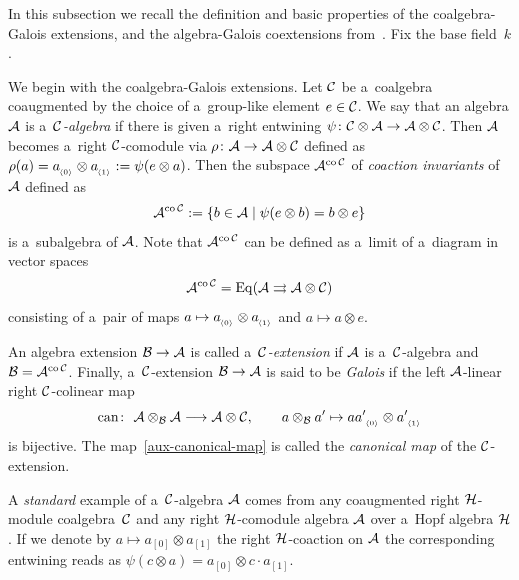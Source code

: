 \documentclass[pdftex]{sigma}
\numberwithin{equation}{section}
\DeclareMathOperator{\co}{co}
\newcommand{\ns}[1]{~\hspace{-4pt}_{_{{\langle#1\rangle}}}}
\begin{document}
In this subsection we recall the def\/inition and basic properties of the coalgebra-Galois extensions, and the
algebra-Galois coextensions from~\cite{BrzeHaja99,BrzeHaja09}.
Fix the base f\/ield~$k$.

We begin with the coalgebra-Galois extensions.
Let ${\cal C}$ be a~coalgebra coaugmented by the choice of a~group-like element $e\in {\cal C}$.
We say that an algebra ${\cal A}$ is a~\emph{${\cal C}$-algebra} if there is given a~right entwining $\psi\colon  {\cal
C}\otimes {\cal A}\rightarrow {\cal A}\otimes {\cal C}$.
Then ${\cal A}$ becomes a~right ${\cal C}$-comodule via $\rho\colon {\cal A} \to {\cal A} \otimes {\cal C}$ def\/ined as
$\rho(a) =a\ns{0} \otimes a\ns{1}:=\psi(e\otimes a)$.
Then the subspace ${\cal A}^{\co {\cal C}}$ of \emph{coaction invariants} of ${\cal A}$ def\/ined as
\begin{gather*}
{\cal A}^{\co {\cal C}}:=\{b \in {\cal A} \mid \psi(e\otimes b)=b\otimes e\}
\end{gather*}
is a~subalgebra of ${\cal A}$.
Note that ${\cal A}^{\co {\cal C}}$ can be def\/ined as a~limit of a~diagram in vector spaces
\begin{gather*}
{\cal A}^{\co{\cal C}}={\rm Eq}({\cal A}\rightrightarrows {\cal A}\otimes {\cal C})
\end{gather*}
consisting of a~pair of maps $a\mapsto a\ns{0} \otimes a\ns{1}$ and $a\mapsto a\otimes e$.

An algebra extension ${\cal B}\to{\cal A}$ is called a~\emph{${\cal C}$-extension} if ${\cal A}$ is a~${\cal C}$-algebra
and ${\cal B} ={\cal A}^{\co {\cal C}}$.
Finally, a~${\cal C}$-extension ${\cal B}\to{\cal A}$ is said to be \emph{Galois} if the left ${\cal A}$-linear right
${\cal C}$-colinear map
\begin{gather}
\label{aux-canonical-map}
\operatorname{can}\colon \ {\cal A} \otimes_{\cal B} {\cal A} \longrightarrow {\cal A} \otimes {\cal C},
\qquad
a\otimes_{\cal B} a' \mapsto aa'\ns{0} \otimes a'\ns{1}
\end{gather}
is bijective.
The map~\eqref{aux-canonical-map} is called the \emph{canonical map} of the ${\cal C}$-extension.

A \emph{standard} example of a~${\cal C}$-algebra ${\cal A}$ comes from any coaugmented right ${\cal H}$-module
coalgebra~${\cal C}$ and any right ${\cal H}$-comodule algebra ${\cal A}$ over a~Hopf algebra ${\cal H}$.
If we denote by $a\mapsto a_{[0]}\otimes a_{[1]}$ the right ${\cal H}$-coaction on ${\cal A}$ the corresponding
entwining reads as $\psi(c\otimes a)=a_{[0]}\otimes c\cdot a_{[1]}$.
\end{document}
